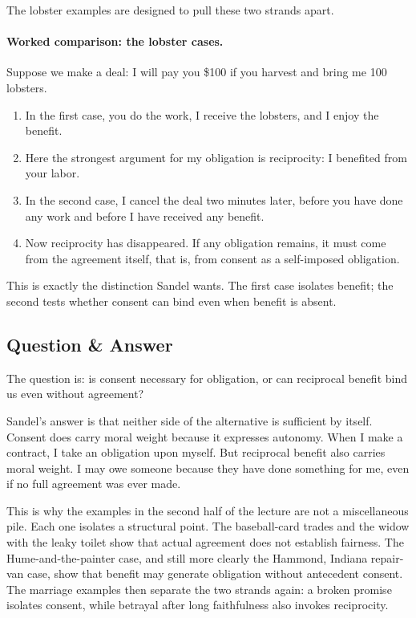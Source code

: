 The lobster examples are designed to pull these two strands apart.

\paragraph{Worked comparison: the lobster cases.}

Suppose we make a deal: I will pay you \$100 if you harvest and bring me 100 lobsters.

\begin{enumerate}
\item In the first case, you do the work, I receive the lobsters, and I enjoy the benefit.
\item Here the strongest argument for my obligation is reciprocity: I benefited from your labor.
\item In the second case, I cancel the deal two minutes later, before you have done any work and before I have received any benefit.
\item Now reciprocity has disappeared. If any obligation remains, it must come from the agreement itself, that is, from consent as a self-imposed obligation.
\end{enumerate}

This is exactly the distinction Sandel wants. The first case isolates benefit; the second tests whether consent can bind even when benefit is absent.

\subsection{Question \& Answer}

The question is: is consent necessary for obligation, or can reciprocal benefit bind us even without agreement?

Sandel's answer is that neither side of the alternative is sufficient by itself. Consent does carry moral weight because it expresses autonomy. When I make a contract, I take an obligation upon myself. But reciprocal benefit also carries moral weight. I may owe someone because they have done something for me, even if no full agreement was ever made.

This is why the examples in the second half of the lecture are not a miscellaneous pile. Each one isolates a structural point. The baseball-card trades and the widow with the leaky toilet show that actual agreement does not establish fairness. The Hume-and-the-painter case, and still more clearly the Hammond, Indiana repair-van case, show that benefit may generate obligation without antecedent consent. The marriage examples then separate the two strands again: a broken promise isolates consent, while betrayal after long faithfulness also invokes reciprocity.

